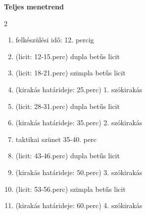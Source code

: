 \documentclass[11pt]{extarticle}
\begin{document}
\vspace{10pt}
{\large \textbf{Teljes menetrend}}
\begin{multicols}{2}
\begin{enumerate}[itemsep=2pt, topsep=4pt]
\item felkészülési idő: 12. percig
\item (licit: 12-15.perc) dupla betűs licit
\item (licit: 18-21.perc) szimpla betűs licit
\item (kirakás határideje: 25.perc) 1. szókirakás
\item (licit: 28-31.perc) dupla betűs licit
\item (kirakás határideje: 35.perc) 2. szókirakás
\item taktikai szünet 35-40. perc
\item (licit: 43-46.perc) dupla betűs licit
\item (kirakás határideje: 50.perc) 3. szókirakás
\item (licit: 53-56.perc) szimpla betűs licit
\item (kirakás határideje: 60.perc) 4. szókirakás
\end{enumerate}
\end{multicols}
\end{document}
